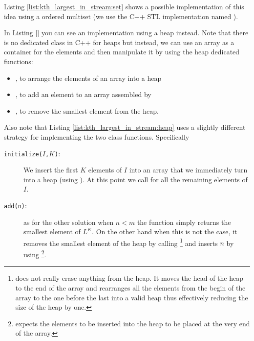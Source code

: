 Listing \ref{list:kth_largest_in_stream:set} shows a possible implementation of this idea using a
ordered multiset (we use the C++ STL implementation named ). 


In Listing \ref{} you can see an implementation using a heap instead. Note that there is no
dedicated class in C++ for heaps but instead, we can use an array as a container for the elements
and then manipulate it by using the heap dedicated functions: 
\begin{itemize}
	\item {}, to arrange the elements of an array into a heap
	\item {}, to add an element to an array assembled by 
	\item {}, to remove the smallest element from the heap.
\end{itemize}

Also note that Listing \ref{list:kth_largest_in_stream:heap} uses a slightly different strategy
for implementing the two class functions. Specifically
\begin{description}
	\item[\texttt{initialize($I$,$K$)}:] We  insert the first $K$ elements of $I$ into an array that
	we immediately turn into a heap (using ). At this point we call
	 for all the remaining elements of $I$.
	\item [\texttt{add(n)}:] as for the other solution when  $n < m$ the function simply returns the
	smallest element of $L^K$. On the other hand when this is not the case, it removes the smallest
	element of the heap by calling \footnote{ does not really erase
	anything from the heap. It moves the head of the heap to the end of the array and rearranges all
	the elements  from the begin of the array to the one before the last into a valid heap thus
	effectively reducing the size of the heap by one.} and inserts $n$ by using
	\footnote{ expects the elements to be inserted into the heap
	to be placed at the very end of the array.}.
\end{description}


